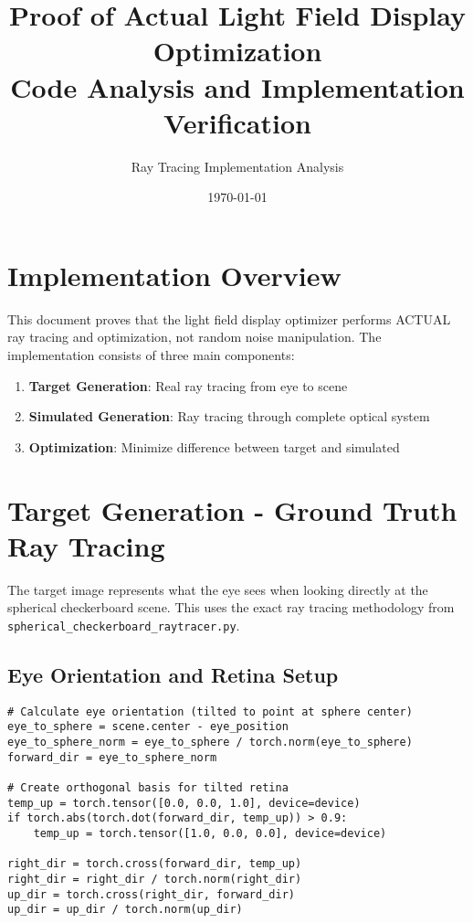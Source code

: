 \documentclass[11pt]{article}
\title{Proof of Actual Light Field Display Optimization\\Code Analysis and Implementation Verification}
\author{Ray Tracing Implementation Analysis}
\date{\today}
\begin{document}
\maketitle

\section{Implementation Overview}

This document proves that the light field display optimizer performs ACTUAL ray tracing and optimization, not random noise manipulation. The implementation consists of three main components:

\begin{enumerate}
    \item \textbf{Target Generation}: Real ray tracing from eye to scene
    \item \textbf{Simulated Generation}: Ray tracing through complete optical system  
    \item \textbf{Optimization}: Minimize difference between target and simulated
\end{enumerate}

\section{Target Generation - Ground Truth Ray Tracing}

The target image represents what the eye sees when looking directly at the spherical checkerboard scene. This uses the exact ray tracing methodology from \texttt{spherical\_checkerboard\_raytracer.py}.

\subsection{Eye Orientation and Retina Setup}

\begin{lstlisting}[caption={Eye orientation calculation}]
# Calculate eye orientation (tilted to point at sphere center)
eye_to_sphere = scene.center - eye_position
eye_to_sphere_norm = eye_to_sphere / torch.norm(eye_to_sphere)
forward_dir = eye_to_sphere_norm

# Create orthogonal basis for tilted retina
temp_up = torch.tensor([0.0, 0.0, 1.0], device=device)
if torch.abs(torch.dot(forward_dir, temp_up)) > 0.9:
    temp_up = torch.tensor([1.0, 0.0, 0.0], device=device)

right_dir = torch.cross(forward_dir, temp_up)
right_dir = right_dir / torch.norm(right_dir)
up_dir = torch.cross(right_dir, forward_dir)
up_dir = up_dir / torch.norm(up_dir)
\end{lstlisting}
\end{document}
